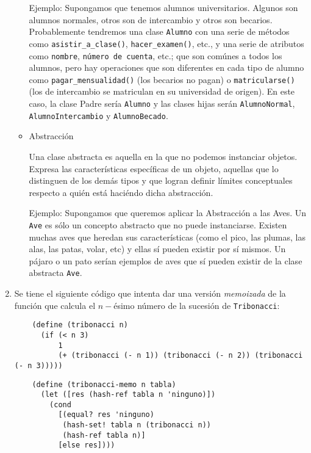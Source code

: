 \documentclass[letterpaper,11pt]{article}
\begin{document}
\begin{enumerate}
\begin{itemize}
        Ejemplo: Supongamos que tenemos alumnos universitarios. Algunos son 
        alumnos normales, otros son de intercambio y otros son becarios. 
        Probablemente tendremos una clase \texttt{Alumno} con una serie de 
        métodos como \texttt{asistir\_a\_clase()}, \texttt{hacer\_examen()}, 
        etc., y una serie de atributos como \texttt{nombre}, \texttt{número de 
        cuenta}, etc.; que son comúnes a todos los alumnos, pero hay operaciones 
        que son diferentes en cada tipo de alumno como 
        \texttt{pagar\_mensualidad()} (los becarios no pagan) o 
        \texttt{matricularse()} (los de intercambio se matriculan en su 
        universidad de origen). En este caso, la clase Padre sería 
        \texttt{Alumno} y las clases hijas serán \texttt{AlumnoNormal},
        \texttt{AlumnoIntercambio} y \texttt{AlumnoBecado}.

        \item Abstracción

        Una clase abstracta es aquella en la que no podemos instanciar objetos.
        Expresa las características específicas de un objeto, aquellas que lo 
        distinguen de los demás tipos y que logran definir límites conceptuales
        respecto a quién está haciéndo dicha abstracción.

        Ejemplo: Supongamos que queremos aplicar la Abstracción a las Aves. 
        Un \texttt{Ave} es sólo un concepto abstracto que no puede instanciarse.
        Existen muchas aves que heredan sus características (como el pico, las 
        plumas, las alas, las patas, volar, etc) y ellas sí pueden existir 
        por sí mismos. Un pájaro o un pato serían ejemplos de aves que sí 
        pueden existir de la clase abstracta \texttt{Ave}.
    \end{itemize}

    \item Se tiene el siguiente código que intenta dar una versión 
    \textit{memoizada} de la función que calcula el $n-$ésimo número de la 
    sucesión de \texttt{Tribonacci}:
    \begin{verbatim}
    (define (tribonacci n)
      (if (< n 3)
          1
          (+ (tribonacci (- n 1)) (tribonacci (- n 2)) (tribonacci (- n 3)))))
    \end{verbatim}
    \begin{verbatim}
    (define (tribonacci-memo n tabla)
      (let ([res (hash-ref tabla n 'ninguno)])
        (cond
          [(equal? res 'ninguno)
           (hash-set! tabla n (tribonacci n))
           (hash-ref tabla n)]
          [else res])))
    \end{verbatim}


\end{enumerate}
\end{document}
